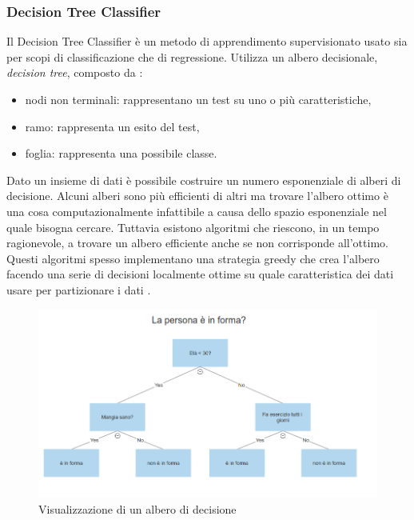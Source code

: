 \documentclass[12pt,italian]{report}
\begin{document}
\subsubsection{Decision Tree Classifier}
Il Decision Tree Classifier è un metodo di apprendimento supervisionato usato sia per scopi di classificazione che di regressione. Utilizza un albero decisionale, \textit{decision tree}, composto da \cite{DataMiningandKnowledgeDiscoveryHandbook}:
\begin{itemize}
	\item nodi non terminali: rappresentano un test su uno o più caratteristiche,
	\item ramo: rappresenta un esito del test,
	\item foglia: rappresenta una possibile classe.
\end{itemize}

Dato un insieme di dati è possibile costruire un numero esponenziale di alberi di decisione. Alcuni alberi sono più efficienti di altri ma trovare l'albero ottimo è una cosa computazionalmente infattibile a causa dello spazio esponenziale nel quale bisogna cercare. Tuttavia esistono algoritmi che riescono, in un tempo ragionevole, a trovare un albero efficiente anche se non corrisponde all'ottimo. Questi algoritmi spesso implementano una strategia greedy che crea l'albero facendo una serie di decisioni localmente ottime su quale caratteristica dei dati usare per partizionare i dati \cite{Introductiontodatamining}.

\begin{figure}[h]
	\centering
	\includegraphics[width = 130mm]{immagini/Decision_Tree}
	\caption{Visualizzazione di un albero di decisione}
\end{figure}
\end{document}
